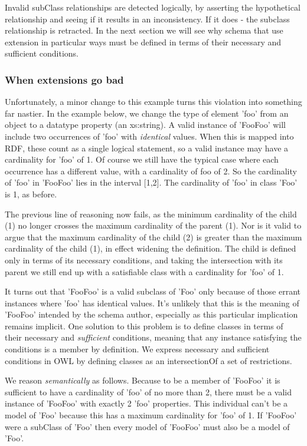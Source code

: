 Invalid subClass relationships are detected logically, by asserting the hypothetical relationship and seeing if it results in an inconsistency. If it does -\/ the subclass relationship is retracted. In the next section we will see why schema that use extension in particular ways must be defined in terms of their necessary and sufficient conditions.\hypertarget{extensioncomplexcontent_badExtensions}{}\subsubsection{When extensions go bad}\label{extensioncomplexcontent_badExtensions}
Unfortunately, a minor change to this example turns this violation into something far nastier. In the example below, we change the type of element 'foo' from an object to a datatype property (an xs:string). A valid instance of 'FooFoo' will include two occurrences of 'foo' with {\itshape identical\/} values. When this is mapped into RDF, these count as a single logical statement, so a valid instance may have a cardinality for 'foo' of 1. Of course we still have the typical case where each occurrence has a different value, with a cardinality of foo of 2. So the cardinality of 'foo' in 'FooFoo' lies in the interval \mbox{[}1,2\mbox{]}. The cardinality of 'foo' in class 'Foo' is 1, as before.

The previous line of reasoning now fails, as the minimum cardinality of the child (1) no longer crosses the maximum cardinality of the parent (1). Nor is it valid to argue that the maximum cardinality of the child (2) is greater than the maximum cardinality of the child (1), in effect widening the definition. The child is defined only in terms of its necessary conditions, and taking the intersection with its parent we still end up with a satisfiable class with a cardinality for 'foo' of 1.

It turns out that 'FooFoo' is a valid subclass of 'Foo' only because of those errant instances where 'foo' has identical values. It's unlikely that this is the meaning of 'FooFoo' intended by the schema author, especially as this particular implication remains implicit. One solution to this problem is to define classes in terms of their necessary and {\itshape sufficient\/} conditions, meaning that any instance satisfying the conditions is a member by definition. We express necessary and sufficient conditions in OWL by defining classes as an intersectionOf a set of restrictions.

We reason {\itshape semantically\/} as follows. Because to be a member of 'FooFoo' it is sufficient to have a cardinality of 'foo' of no more than 2, there must be a valid instance of 'FooFoo' with exactly 2 'foo' properties. This individual can't be a model of 'Foo' because this has a maximum cardinality for 'foo' of 1. If 'FooFoo' were a subClass of 'Foo' then every model of 'FooFoo' must also be a model of 'Foo'.


